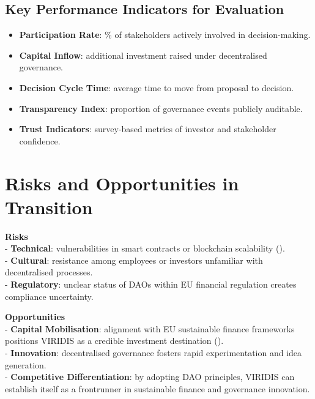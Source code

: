 \documentclass[
  english,
  12pt,
  oneside,
  open=any]{scrbook}
\providecommand{\tightlist}{%
  \setlength{\itemsep}{0pt}\setlength{\parskip}{0pt}}\usepackage{longtable,booktabs,array}
\begin{document}
\subsection{Key Performance Indicators for Evaluation}\label{sec-kpis}

\begin{itemize}
\tightlist
\item
  \textbf{Participation Rate}: \% of stakeholders actively involved in
  decision-making.\\
\item
  \textbf{Capital Inflow}: additional investment raised under
  decentralised governance.\\
\item
  \textbf{Decision Cycle Time}: average time to move from proposal to
  decision.\\
\item
  \textbf{Transparency Index}: proportion of governance events publicly
  auditable.\\
\item
  \textbf{Trust Indicators}: survey-based metrics of investor and
  stakeholder confidence.
\end{itemize}

\section{Risks and Opportunities in Transition}\label{sec-risks}

\textbf{Risks}\\
- \textbf{Technical}: vulnerabilities in smart contracts or blockchain
scalability ().\\
- \textbf{Cultural}: resistance among employees or investors unfamiliar
with decentralised processes.\\
- \textbf{Regulatory}: unclear status of DAOs within EU financial
regulation creates compliance uncertainty.

\textbf{Opportunities}\\
- \textbf{Capital Mobilisation}: alignment with EU sustainable finance
frameworks positions VIRIDIS as a credible investment destination
().\\
- \textbf{Innovation}: decentralised governance fosters rapid
experimentation and idea generation.\\
- \textbf{Competitive Differentiation}: by adopting DAO principles,
VIRIDIS can establish itself as a frontrunner in sustainable finance and
governance innovation.
\end{document}
